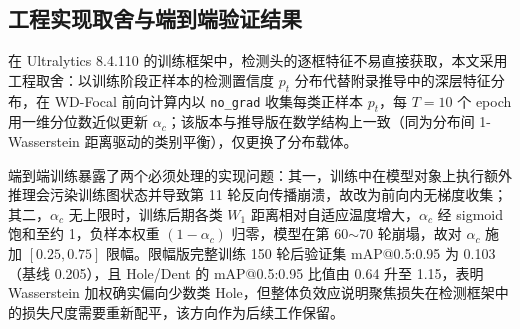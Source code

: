 \subsection{工程实现取舍与端到端验证结果}

在 Ultralytics 8.4.110 的训练框架中，检测头的逐框特征不易直接获取，本文采用工程取舍：以训练阶段正样本的检测置信度 $p_t$ 分布代替附录推导中的深层特征分布，在 WD-Focal 前向计算内以 \texttt{no\_grad} 收集每类正样本 $p_t$，每 $T=10$ 个 epoch 用一维分位数近似更新 $\alpha_c$；该版本与推导版在数学结构上一致（同为分布间 1-Wasserstein 距离驱动的类别平衡），仅更换了分布载体。

端到端训练暴露了两个必须处理的实现问题：其一，训练中在模型对象上执行额外推理会污染训练图状态并导致第 11 轮反向传播崩溃，故改为前向内无梯度收集；其二，$\alpha_c$ 无上限时，训练后期各类 $W_1$ 距离相对自适应温度增大，$\alpha_c$ 经 sigmoid 饱和至约 1，负样本权重 $(1-\alpha_c)$ 归零，模型在第 60$\sim$70 轮崩塌，故对 $\alpha_c$ 施加 $[0.25,0.75]$ 限幅。限幅版完整训练 150 轮后验证集 mAP@0.5:0.95 为 0.103（基线 0.205），且 Hole/Dent 的 mAP@0.5:0.95 比值由 0.64 升至 1.15，表明 Wasserstein 加权确实偏向少数类 Hole，但整体负效应说明聚焦损失在检测框架中的损失尺度需要重新配平，该方向作为后续工作保留。
